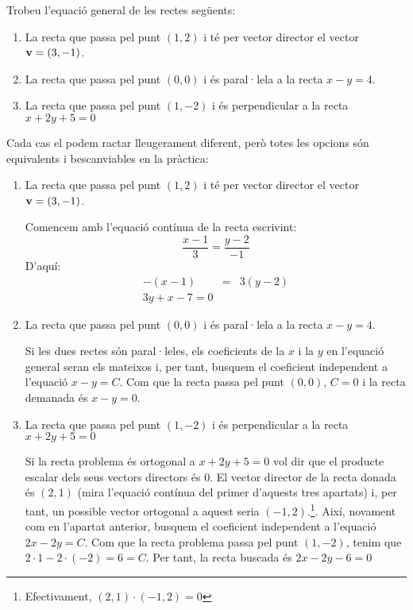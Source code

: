 \Exercise Trobeu l'equació general de les rectes següents:
\begin{enumerate}
  \item La recta que passa pel punt $(1,2)$ i té per vector director el vector $\textbf{v}=(3,-1)$.
  \item La recta que passa pel punt $(0,0)$ i és paral·lela a la recta $x-y=4$.
  \item La recta que passa pel punt $(1,-2)$ i és perpendicular a la recta $x+2y+5=0$
\end{enumerate}

\Answer Cada cas el podem ractar lleugerament diferent, però totes les opcions són equivalents i bescanviables en la pràctica:
\begin{enumerate}
  \item La recta que passa pel punt $(1,2)$ i té per vector director el vector $\textbf{v}=(3,-1)$.
 
  Comencem amb l'equació contínua de la recta escrivint:
  \[
  \frac{x-1}{3}=\frac{y-2}{-1}
  \]
  D'aquí:
  \begin{eqnarray*}
    -(x-1)&=&3(y-2)\\
    3y+x-7=0
  \end{eqnarray*}

  \item La recta que passa pel punt $(0,0)$ i és paral·lela a la recta $x-y=4$.

  Si les dues rectes són paral·leles, els coeficients de la $x$ i la $y$ en l'equació general seran els mateixos i, per tant, busquem el coeficient independent a l'equació $x-y=C$. Com que la recta passa pel punt $(0,0)$, $C=0$ i la recta demanada és $x-y=0$.

  \item La recta que passa pel punt $(1,-2)$ i és perpendicular a la recta $x+2y+5=0$

  Si la recta problema és ortogonal a $x+2y+5=0$ vol dir que el producte escalar dels seus vectors directors és $0$. El vector director de la recta donada és $(2,1)$ (mira l'equació contínua del primer d'aquests tres apartats) i, per tant, un possible vector ortogonal a aquest seria $(-1,2)$.\footnote{Efectivament, $(2,1)\cdot(-1,2)=0$}. Així, novament com en l'apartat anterior, busquem el coeficient independent a l'equació $2x-2y=C$. Com que la recta problema passa pel punt $(1,-2)$, tenim que $2\cdot1-2\cdot(-2)=6=C$. Per tant, la recta buscada és $2x-2y-6=0$

\end{enumerate}
\blacksquare
